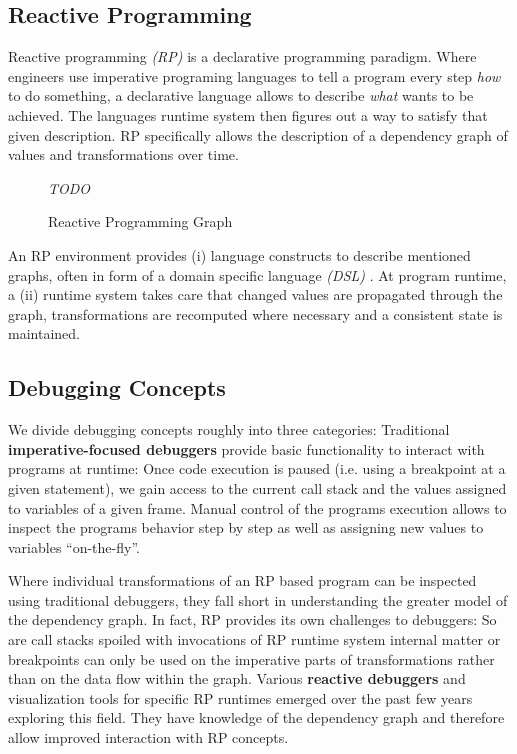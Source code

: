 \documentclass[12pt,a4paper]{article}
\begin{document}
\subsection{Reactive Programming}

Reactive programming \emph{(RP)} is a declarative programming paradigm. Where engineers use imperative programing languages to tell a program every step \emph{how} to do something, a declarative language allows to describe \emph{what} wants to be achieved. The languages runtime system then figures out a way to satisfy that given description. RP specifically allows the description of a dependency graph of values and transformations over time.

\begin{figure}[h]
	\centering
	\emph{TODO}

	\caption{Reactive Programming Graph}
	\label{fig:reactive-programming}
\end{figure}

An RP environment provides (i) language constructs to describe mentioned graphs, often in form of a domain specific language \emph{(DSL)} \cite{REScala} \cite{otherRPDSL}. At program runtime, a (ii) runtime system takes care that changed values are propagated through the graph, transformations are recomputed where necessary and a consistent state is maintained.

\subsection{Debugging Concepts}

We divide debugging concepts roughly into three categories: Traditional \textbf{imperative-focused debuggers} provide basic functionality to interact with programs at runtime: Once code execution is paused (i.e. using a breakpoint at a given statement), we gain access to the current call stack and the values assigned to variables of a given frame. Manual control of the programs execution allows to inspect the programs behavior step by step as well as assigning new values to variables ``on-the-fly''.

Where individual transformations of an RP based program can be inspected using traditional debuggers, they fall short in understanding the greater model of the dependency graph. In fact, RP provides its own challenges to debuggers: So are call stacks spoiled with invocations of RP runtime system internal matter or breakpoints can only be used on the imperative parts of transformations rather than on the data flow within the graph. Various \textbf{reactive debuggers} and visualization tools for specific RP runtimes emerged over the past few years \cite{REDebuggerSalvaneschi} \cite{RxViz} \cite{RxFiddle} exploring this field. They have knowledge of the dependency graph and therefore allow improved interaction with RP concepts.
\end{document}
